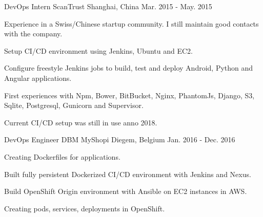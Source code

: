 

\begin{cventries}

  \cventry
    {DevOps Intern} %
    {ScanTrust} %
    {Shanghai, China} %
    {Mar. 2015 - May. 2015} %
    {
      \begin{cvitems} %
        \item {Experience in a Swiss/Chinese startup community. I still maintain good contacts with the company.}
        \item {Setup CI/CD environment using Jenkins, Ubuntu and EC2.}
        \item {Configure freestyle Jenkins jobs to build, test and deploy Android, Python and Angular applications.}
        \item {First experiences with Npm, Bower, BitBucket, Nginx, PhantomJs, Django, S3, Sqlite, Postgresql, Gunicorn and Supervisor.}
        \item {Current CI/CD setup was still in use anno 2018.}
      \end{cvitems}
    }

  \cventry
    {DevOps Engineer} %
    {DBM MyShopi} %
    {Diegem, Belgium} %
    {Jan. 2016 - Dec. 2016} %
    {
      \begin{cvitems} %
        \item {Creating Dockerfiles for applications.}
        \item {Built fully persistent Dockerized CI/CD environment with Jenkins and Nexus.}
        \item {Build OpenShift Origin environment with Ansible on EC2 instances in AWS.}
        \item {Creating pods, services, deployments in OpenShift.}
      \end{cvitems}
    }


\end{cventries}
